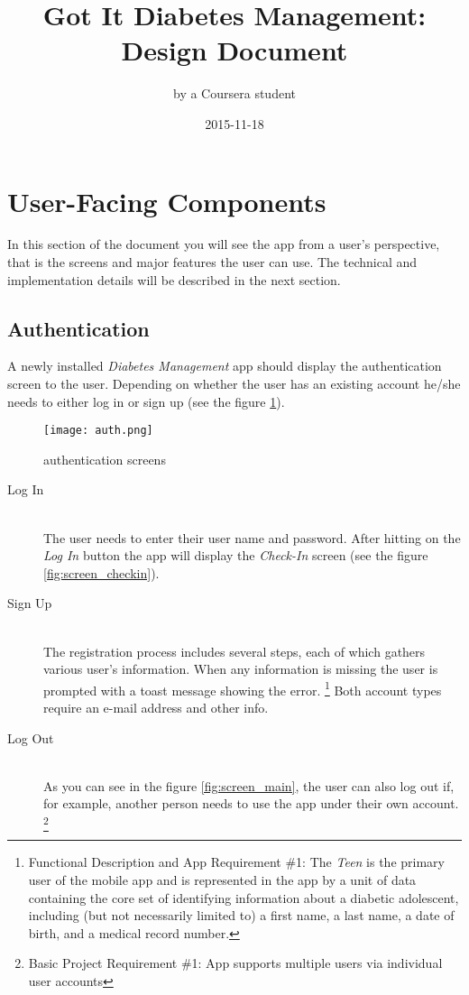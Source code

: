 \documentclass{article}
\title{Got It Diabetes Management:\\Design Document}
\date{2015-11-18}
\author{by a Coursera student}
\begin{document}
    \maketitle
    \newpage

\section{User-Facing Components}

    In this section of the document you will see the app from a user's perspective, that is the screens and major features the user can use. The technical and implementation details will be described in the next section.

\newpage

    \subsection{Authentication}

    A newly installed \emph{Diabetes Management} app should display the authentication screen to the user. Depending on whether the user has an existing account he/she needs to either log in or sign up (see the figure \ref{fig:screen_auth}).

    \begin{figure}[h]
        \centering
        \texttt{[image: auth.png]}
        \caption{authentication screens}
        \label{fig:screen_auth}
    \end{figure}

    \begin{description}
        \item[Log In] \hfill \\
            The user needs to enter their user name and password. After hitting on the \emph{Log In} button the app will display the \emph{Check-In} screen (see the figure \ref{fig:screen_checkin}).
        \item[Sign Up] \hfill \\
            The registration process includes several steps, each of which gathers various user's information. When any information is missing the user is prompted with a toast message showing the error.
            \footnote{Functional Description and App Requirement \#1: The \emph{Teen} is the primary user of the mobile app and is represented in the app by a unit of data containing the core set of identifying information about a diabetic adolescent, including (but not necessarily limited to) a first name, a last name, a date of birth, and a medical record number.}
            Both account types require an e-mail address and other info.
        \item[Log Out] \hfill \\
            As you can see in the figure \ref{fig:screen_main}, the user can also log out if, for example, another person needs to use the app under their own account.
            \footnote{Basic Project Requirement \#1: App supports multiple users via individual user accounts}
    \end{description}
\end{document}
